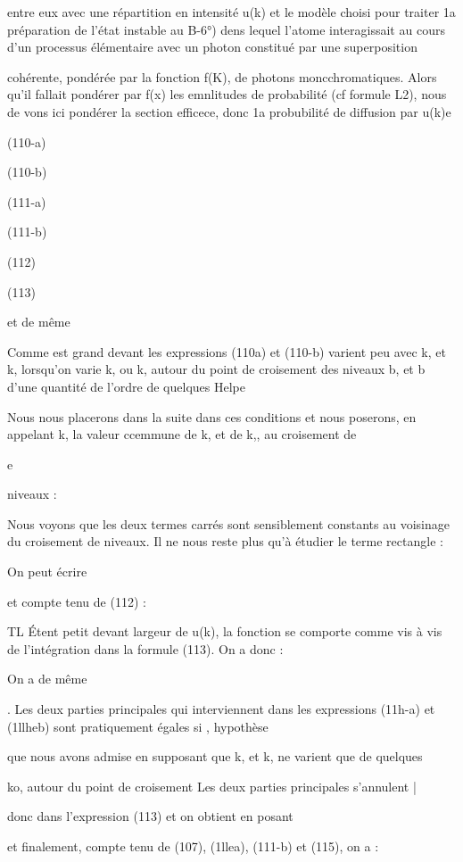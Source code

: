 entre eux avec une répartition en intensité u(k) et le modèle choisi pour traiter
1a préparation de l'état instable au  B-6°) dens lequel l'atome interagissait au
cours d'un processus élémentaire avec un photon constitué par une superposition

cohérente, pondérée par la fonction f(K), de photons moncchromatiques. Alors qu'il
fallait pondérer par f(x) les emnlitudes de probabilité (cf formule L2), nous de
vons ici pondérer la section efficece, donc 1a probubilité de diffusion par u(k)e


(110-a)

(110-b)

(111-a)

(111-b)

(112)

(113)



et de même

Comme  est grand devant  les expressions (110a) et
(110-b) varient peu avec k, et k, lorsqu'on varie k, ou k, autour du point
de croisement des niveaux b, et b d'une quantité de l'ordre de quelques
Helpe

Nous nous placerons dans la suite dans ces conditions et nous
poserons, en appelant k, la valeur ccemmune de k, et de k,, au croisement de

e

niveaux :

Nous voyons que les deux termes carrés sont sensiblement constants au voisinage du croisement de niveaux. Il ne nous reste plus qu'à étudier le terme rectangle :

On peut écrire

et compte tenu de (112) :

TL Étent petit devant largeur de u(k), la fonction
se comporte comme
vis à vis de l'intégration dans la formule (113). On a donc :

On a de même

. Les deux parties principales qui interviennent dans les expressions (11h-a) et (1llheb) sont pratiquement égales si , hypothèse

que nous avons admise en supposant que k, et k, ne varient que de quelques

ko, autour du point de croisement Les deux parties principales s'annulent |

donc dans l'expression (113) et on obtient en posant 

et finalement, compte tenu de (107), (1llea), (111-b) et (115), on a :

